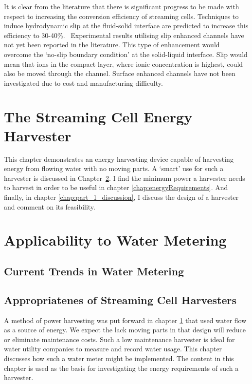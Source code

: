     It is clear from the literature that there is significant progress to be made with respect to increasing the conversion efficiency of streaming cells.
    Techniques to induce hydrodynamic slip at the fluid-solid interface are predicted to increase this efficiency to 30-40\%.~\cite{Davidson2008a, Ren2008a}
    Experimental results utilising slip enhanced channels have not yet been reported in the literature.
    This type of enhancement would overcome the `no-slip boundary condition' at the solid-liquid interface.
    Slip would mean that ions in the compact layer, where ionic concentration is highest, could also be moved through the channel.
    Surface enhanced channels have not been investigated due to cost and manufacturing difficulty.

\chapter{The Streaming Cell Energy Harvester}
  \label{chap:harvestingEnergy}

  This chapter demonstrates an energy harvesting device capable of harvesting energy from flowing water with no moving parts.
  A `smart' use for such a harvester is discussed in Chapter~\ref{chap:wirelessWaterMetering}.
  I find the minimum power a harvester needs to harvest in order to be useful in chapter \ref{chap:energyRequirements}.
  And finally, in chapter \ref{chap:part_1_discussion}, I discuss the design of a harvester and comment on its feasibility.

  

\chapter{Applicability to Water Metering}
  \label{chap:wirelessWaterMetering}
  \section{Current Trends in Water Metering}
  \section{Appropriatenes of Streaming Cell Harvesters}

  A method of power harvesting was put forward in chapter \ref{chap:harvestingEnergy} that used water flow as a source of energy.
  We expect the lack moving parts in that design will reduce or eliminate maintenance costs.
  Such a low maintenance harvester is ideal for water utility companies to measure and record water usage.
  This chapter discusses how such a water meter might be implemented.
  The content in this chapter is used as the basis for investigating the energy requirements of such a harvester.
  

